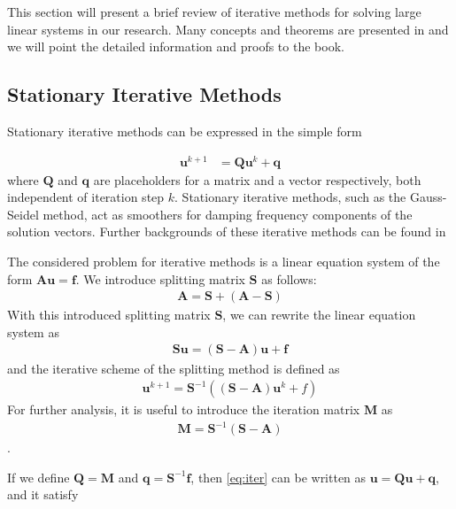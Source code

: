 This section will present a brief review of iterative methods for solving large linear systems in our research. Many concepts and theorems are presented in \cite{doi:10.1137/1.9780898718003} and we will point the detailed information and proofs to the book.
\subsection{Stationary Iterative Methods}
\label{sec:iterative-methods}
Stationary iterative methods can be expressed in the simple form

\begin{align}
    \boldsymbol{u}^{k+1} &= \boldsymbol{Q} \boldsymbol{u}^k + \boldsymbol{q}
    \label{iter:stationary}
\end{align}
where $\boldsymbol{Q}$ and $\boldsymbol{q}$ are placeholders for a matrix and a vector respectively, both independent of iteration step $k$. Stationary iterative methods, such as the Gauss-Seidel method, act as smoothers for damping frequency components of the solution vectors. Further backgrounds of these iterative methods can be found in \cite{doi:10.1137/1.9780898718003}

The considered problem for iterative methods is a linear equation system of the form $\boldsymbol{A} \boldsymbol{u} = \boldsymbol{f}$. We introduce splitting matrix $\boldsymbol{S}$ as follows:
\begin{align}
    \boldsymbol{A} = \boldsymbol{S} + (\boldsymbol{A} - \boldsymbol{S})
\end{align}
With this introduced splitting matrix $\boldsymbol{S}$, we can rewrite the linear equation system as
\begin{align}
    \boldsymbol{S}\boldsymbol{u} = (\boldsymbol{S} - \boldsymbol{A}) \boldsymbol{u} + \boldsymbol{f}
\end{align}
and the iterative scheme of the splitting method is defined as 
\begin{align}
    \boldsymbol{u}^{k+1} = \boldsymbol{S}^{-1}((\boldsymbol{S} - \boldsymbol{A}) \boldsymbol{u}^k + f)
    \label{eq:iter}
\end{align}
For further analysis, it is useful to introduce the iteration matrix $\boldsymbol{M}$ as
\begin{align}
    \boldsymbol{M} = \boldsymbol{S}^{-1}(\boldsymbol{S} - \boldsymbol{A})
\end{align}.

If we define $\boldsymbol{Q} = \boldsymbol{M}$ and $\boldsymbol{q} = \boldsymbol{S}^{-1}\boldsymbol{f}$, then \autoref{eq:iter} can be written as $\boldsymbol{u} = \boldsymbol{Q}\boldsymbol{u} + \boldsymbol{q}$, and it satisfy

